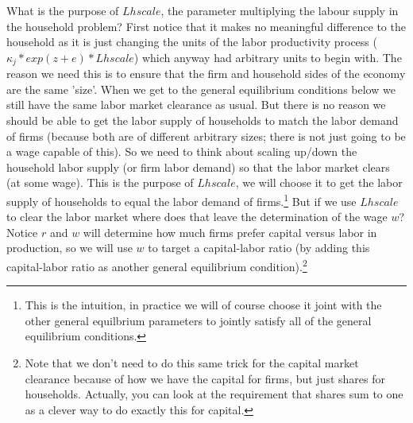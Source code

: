 What is the purpose of $Lhscale$, the parameter multiplying the labour supply in the household problem? First notice that it makes no meaningful difference to the household as it is just changing the units of the labor productivity process ($\kappa_{j}*exp(z+e)*Lhscale$) which anyway had arbitrary units to begin with. The reason we need this is to ensure that the firm and household sides of the economy are the same 'size'. When we get to the general equilibrium conditions below we still have the same labor market clearance as usual. But there is no reason we should be able to get the labor supply of households to match the labor demand of firms (because both are of different arbitrary sizes; there is not just going to be a wage capable of this). So we need to think about scaling up/down the household labor supply (or firm labor demand) so that the labor market clears (at some wage). This is the purpose of $Lhscale$, we will choose it to get the labor supply of households to equal the labor demand of firms.\footnote{This is the intuition, in practice we will of course choose it joint with the other general equilbrium parameters to jointly satisfy all of the general equilibrium conditions.} But if we use $Lhscale$ to clear the labor market where does that leave the determination of the wage $w$? Notice $r$ and $w$ will determine how much firms prefer capital versus labor in production, so we will use $w$ to target a capital-labor ratio (by adding this capital-labor ratio as another general equilibrium condition).\footnote{Note that we don't need to do this same trick for the capital market clearance because of how we have the capital for firms, but just shares for households. Actually, you can look at the requirement that shares sum to one as a clever way to do exactly this for capital.}

